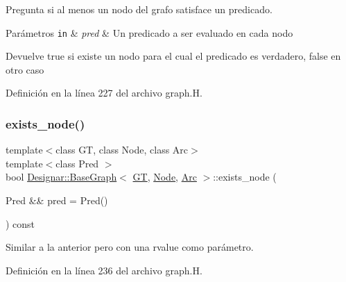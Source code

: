 Pregunta si al menos un nodo del grafo satisface un predicado. 


\begin{DoxyParams}[1]{Parámetros}
\mbox{\tt in}  & {\em pred} & Un predicado a ser evaluado en cada nodo \\
\hline
\end{DoxyParams}
\begin{DoxyReturn}{Devuelve}
{\ttfamily true} si existe un nodo para el cual el predicado es verdadero, {\ttfamily false} en otro caso 
\end{DoxyReturn}


Definición en la línea 227 del archivo graph.\+H.

\mbox{\label{class_designar_1_1_base_graph_a62df2c7ec71d2b009e96f8974968a3fc}} 
\subsubsection{\texorpdfstring{exists\+\_\+node()}{exists\_node()}\hspace{0.1cm}{\footnotesize\ttfamily [2/2]}}
{\footnotesize\ttfamily template$<$class GT, class Node, class Arc$>$ \\
template$<$class Pred $>$ \\
bool \hyperlink{class_designar_1_1_base_graph}{Designar\+::\+Base\+Graph}$<$ \hyperlink{demo-buildgraph_8_c_a3001c40d2c31ca87ed96cd7d1334a55e}{GT}, \hyperlink{namespace_designar_a5af326c65aa2bd26b26c410f2030d09e}{Node}, \hyperlink{namespace_designar_a3f55fb5513d62ff47cbc8f72b8e95d6f}{Arc} $>$\+::exists\+\_\+node (\begin{DoxyParamCaption}\item[{Pred \&\&}]{pred = {\ttfamily Pred()} }\end{DoxyParamCaption}) const\hspace{0.3cm}{\ttfamily [inline]}}



Similar a la anterior pero con una rvalue como parámetro. 



Definición en la línea 236 del archivo graph.\+H.

\mbox{\label{class_designar_1_1_base_graph_a5e35c97bdf055f67e744f7d961ccb6a9}} 
